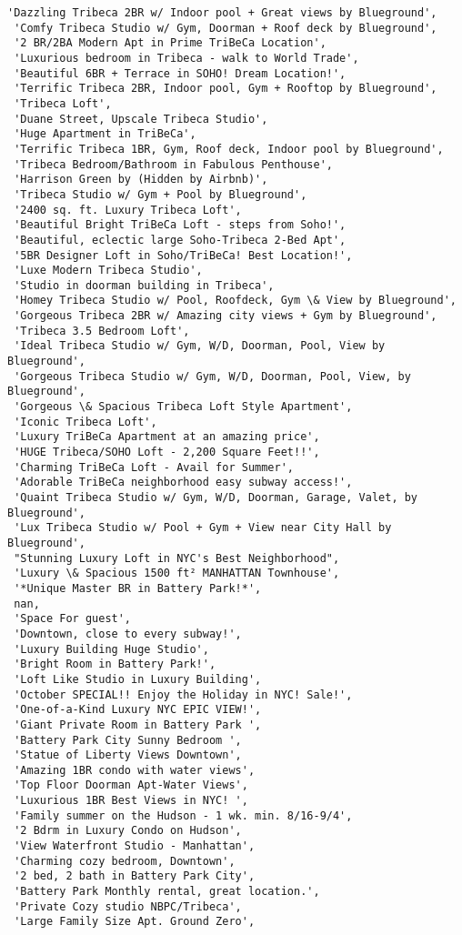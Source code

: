 \documentclass[11pt]{article}
\begin{document}
\begin{tcolorbox}[breakable, size=fbox, boxrule=.5pt, pad at break*=1mm, opacityfill=0]
\begin{Verbatim}[commandchars=\\\{\}]
 'Dazzling Tribeca 2BR w/ Indoor pool + Great views by Blueground',
 'Comfy Tribeca Studio w/ Gym, Doorman + Roof deck by Blueground',
 '2 BR/2BA Modern Apt in Prime TriBeCa Location',
 'Luxurious bedroom in Tribeca - walk to World Trade',
 'Beautiful 6BR + Terrace in SOHO! Dream Location!',
 'Terrific Tribeca 2BR, Indoor pool, Gym + Rooftop by Blueground',
 'Tribeca Loft',
 'Duane Street, Upscale Tribeca Studio',
 'Huge Apartment in TriBeCa',
 'Terrific Tribeca 1BR, Gym, Roof deck, Indoor pool by Blueground',
 'Tribeca Bedroom/Bathroom in Fabulous Penthouse',
 'Harrison Green by (Hidden by Airbnb)',
 'Tribeca Studio w/ Gym + Pool by Blueground',
 '2400 sq. ft. Luxury Tribeca Loft',
 'Beautiful Bright TriBeCa Loft - steps from Soho!',
 'Beautiful, eclectic large Soho-Tribeca 2-Bed Apt',
 '5BR Designer Loft in Soho/TriBeCa! Best Location!',
 'Luxe Modern Tribeca Studio',
 'Studio in doorman building in Tribeca',
 'Homey Tribeca Studio w/ Pool, Roofdeck, Gym \& View by Blueground',
 'Gorgeous Tribeca 2BR w/ Amazing city views + Gym by Blueground',
 'Tribeca 3.5 Bedroom Loft',
 'Ideal Tribeca Studio w/ Gym, W/D, Doorman, Pool, View by Blueground',
 'Gorgeous Tribeca Studio w/ Gym, W/D, Doorman, Pool, View, by Blueground',
 'Gorgeous \& Spacious Tribeca Loft Style Apartment',
 'Iconic Tribeca Loft',
 'Luxury TriBeCa Apartment at an amazing price',
 'HUGE Tribeca/SOHO Loft - 2,200 Square Feet!!',
 'Charming TriBeCa Loft - Avail for Summer',
 'Adorable TriBeCa neighborhood easy subway access!',
 'Quaint Tribeca Studio w/ Gym, W/D, Doorman, Garage, Valet, by Blueground',
 'Lux Tribeca Studio w/ Pool + Gym + View near City Hall by Blueground',
 "Stunning Luxury Loft in NYC's Best Neighborhood",
 'Luxury \& Spacious 1500 ft² MANHATTAN Townhouse',
 '*Unique Master BR in Battery Park!*',
 nan,
 'Space For guest',
 'Downtown, close to every subway!',
 'Luxury Building Huge Studio',
 'Bright Room in Battery Park!',
 'Loft Like Studio in Luxury Building',
 'October SPECIAL!! Enjoy the Holiday in NYC! Sale!',
 'One-of-a-Kind Luxury NYC EPIC VIEW!',
 'Giant Private Room in Battery Park ',
 'Battery Park City Sunny Bedroom ',
 'Statue of Liberty Views Downtown',
 'Amazing 1BR condo with water views',
 'Top Floor Doorman Apt-Water Views',
 'Luxurious 1BR Best Views in NYC! ',
 'Family summer on the Hudson - 1 wk. min. 8/16-9/4',
 '2 Bdrm in Luxury Condo on Hudson',
 'View Waterfront Studio - Manhattan',
 'Charming cozy bedroom, Downtown',
 '2 bed, 2 bath in Battery Park City',
 'Battery Park Monthly rental, great location.',
 'Private Cozy studio NBPC/Tribeca',
 'Large Family Size Apt. Ground Zero',

\end{Verbatim}
\end{tcolorbox}
\end{document}
